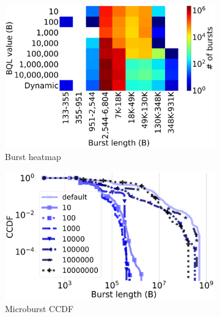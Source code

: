 \begin{figure}[t]
	\centering
 	\begin{subfigure}[t]{.26\linewidth}
	\centering\includegraphics[width=1\linewidth]{figs/bql1.pdf}
			\vspace{-2mm}
	\caption{Burst heatmap}
    \label{fig:bql}
    \end{subfigure}
	\begin{subfigure}[t]{.26\linewidth}
	\centering\includegraphics[width=1\linewidth]{figs/bqlccdf_testbed.pdf}
			\vspace{-2mm}
	\caption{Microburst CCDF}
    \label{fig:bql-ccdf}
    \end{subfigure}
    	\begin{subfigure}[t]{.22\linewidth}

\end{subfigure}
\end{figure}
